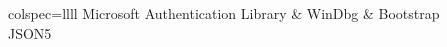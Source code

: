 \documentclass[10mm,letterpaper,notitlepage]{article}
\begin{document}
{\begin{tblr}{colspec={llll}}
								Microsoft Authentication Library
							&
								WinDbg
							&
								Bootstrap
						\\
									JSON5
						\\
						\end{tblr}\phantom{}\\
					\setlength{\parindent}{\parindent-4mm}
				\par}
			\setlength{\parindent}{\parindent-4mm}
\end{document}
